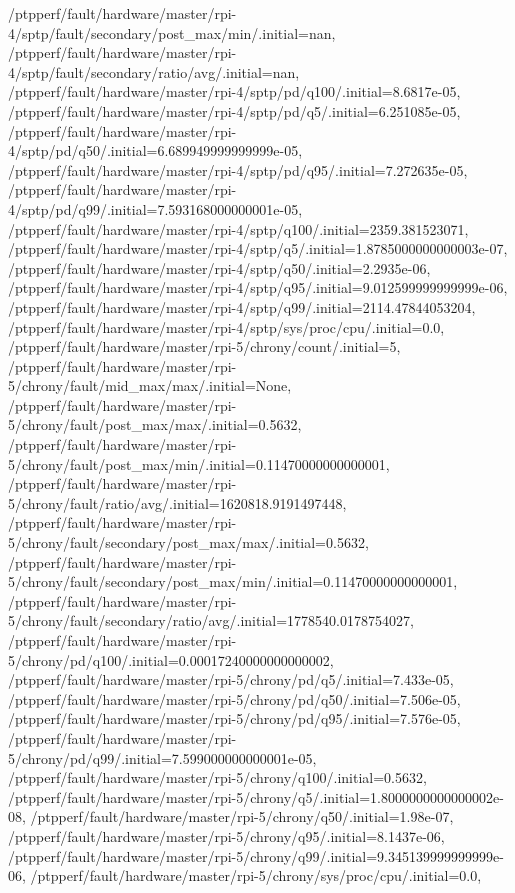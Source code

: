 {    /ptpperf/fault/hardware/master/rpi-4/sptp/fault/secondary/post_max/min/.initial=nan,
    /ptpperf/fault/hardware/master/rpi-4/sptp/fault/secondary/ratio/avg/.initial=nan,
    /ptpperf/fault/hardware/master/rpi-4/sptp/pd/q100/.initial=8.6817e-05,
    /ptpperf/fault/hardware/master/rpi-4/sptp/pd/q5/.initial=6.251085e-05,
    /ptpperf/fault/hardware/master/rpi-4/sptp/pd/q50/.initial=6.689949999999999e-05,
    /ptpperf/fault/hardware/master/rpi-4/sptp/pd/q95/.initial=7.272635e-05,
    /ptpperf/fault/hardware/master/rpi-4/sptp/pd/q99/.initial=7.593168000000001e-05,
    /ptpperf/fault/hardware/master/rpi-4/sptp/q100/.initial=2359.381523071,
    /ptpperf/fault/hardware/master/rpi-4/sptp/q5/.initial=1.8785000000000003e-07,
    /ptpperf/fault/hardware/master/rpi-4/sptp/q50/.initial=2.2935e-06,
    /ptpperf/fault/hardware/master/rpi-4/sptp/q95/.initial=9.012599999999999e-06,
    /ptpperf/fault/hardware/master/rpi-4/sptp/q99/.initial=2114.47844053204,
    /ptpperf/fault/hardware/master/rpi-4/sptp/sys/proc/cpu/.initial=0.0,
    /ptpperf/fault/hardware/master/rpi-5/chrony/count/.initial=5,
    /ptpperf/fault/hardware/master/rpi-5/chrony/fault/mid_max/max/.initial=None,
    /ptpperf/fault/hardware/master/rpi-5/chrony/fault/post_max/max/.initial=0.5632,
    /ptpperf/fault/hardware/master/rpi-5/chrony/fault/post_max/min/.initial=0.11470000000000001,
    /ptpperf/fault/hardware/master/rpi-5/chrony/fault/ratio/avg/.initial=1620818.9191497448,
    /ptpperf/fault/hardware/master/rpi-5/chrony/fault/secondary/post_max/max/.initial=0.5632,
    /ptpperf/fault/hardware/master/rpi-5/chrony/fault/secondary/post_max/min/.initial=0.11470000000000001,
    /ptpperf/fault/hardware/master/rpi-5/chrony/fault/secondary/ratio/avg/.initial=1778540.0178754027,
    /ptpperf/fault/hardware/master/rpi-5/chrony/pd/q100/.initial=0.00017240000000000002,
    /ptpperf/fault/hardware/master/rpi-5/chrony/pd/q5/.initial=7.433e-05,
    /ptpperf/fault/hardware/master/rpi-5/chrony/pd/q50/.initial=7.506e-05,
    /ptpperf/fault/hardware/master/rpi-5/chrony/pd/q95/.initial=7.576e-05,
    /ptpperf/fault/hardware/master/rpi-5/chrony/pd/q99/.initial=7.599000000000001e-05,
    /ptpperf/fault/hardware/master/rpi-5/chrony/q100/.initial=0.5632,
    /ptpperf/fault/hardware/master/rpi-5/chrony/q5/.initial=1.8000000000000002e-08,
    /ptpperf/fault/hardware/master/rpi-5/chrony/q50/.initial=1.98e-07,
    /ptpperf/fault/hardware/master/rpi-5/chrony/q95/.initial=8.1437e-06,
    /ptpperf/fault/hardware/master/rpi-5/chrony/q99/.initial=9.345139999999999e-06,
    /ptpperf/fault/hardware/master/rpi-5/chrony/sys/proc/cpu/.initial=0.0,
}
